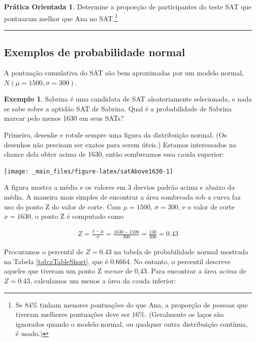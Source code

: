 \documentclass[
]{book}
\theoremstyle{definition}
\theoremstyle{definition}
\newtheorem{example}{Exemplo}[chapter]
\theoremstyle{definition}
\newtheorem{exercise}{Prática Orientada}[chapter]
\theoremstyle{definition}
\theoremstyle{remark}
\begin{document}
\begin{exercise}
\protect\hypertarget{exr:unnamed-chunk-91}{}{\label{exr:unnamed-chunk-91} }Determine a proporção de participantes do teste SAT que pontuaram melhor que Ana no SAT.\footnote{Se \(84\%\) tinham menores pontuações do que Ana, a proporção de pessoas que tiveram melhores pontuações deve ser \(16\%\). (Geralmente os laços são ignorados quando o modelo normal, ou qualquer outra distribuição contínua, é usado.)}
\end{exercise}

\begin{center}\rule{0.5\linewidth}{0.5pt}\end{center}

\hypertarget{normalProbabiliyExamples}{%
\subsection{Exemplos de probabilidade normal}\label{normalProbabiliyExamples}}

A pontuação cumulativa do SAT são bem aproximadas por um modelo normal, \(N(\mu=1500, \sigma=300)\).

\begin{example}
\protect\hypertarget{exm:unnamed-chunk-92}{}{\label{exm:unnamed-chunk-92} }Sabrina é uma candidata de SAT aleatoriamente selecionada, e nada se sabe sobre a aptidão SAT de Sabrina. Qual é a probabilidade de Sabrina marcar pelo menos 1630 em seus SATs?

Primeiro, desenhe e rotule sempre uma figura da distribuição normal. (Os desenhos não precisam ser exatos para serem úteis.) Estamos interessados na chance dela obter acima de 1630, então sombreamos essa cauda superior:
\end{example}

\texttt{[image: \_main\_files/figure-latex/satAbove1630-1]}

A figura mostra a média e os valores em 3 desvios padrão acima e abaixo da média. A maneira mais simples de encontrar a área sombreada sob a curva faz uso do ponto Z do valor de corte. Com \(\mu=1500\), \(\sigma=300\), e o valor de corte \(x=1630\), o ponto Z é computado como

\begin{eqnarray*}
Z = \frac{x - \mu}{\sigma} = \frac{1630 - 1500}{300} = \frac{130}{300} = 0.43
\end{eqnarray*}

Procuramos o percentil de \(Z=0.43\) na tabela de probabilidade normal mostrada na Tabela \ref{tab:zTableShort}, que é 0.6664. No entanto, o percentil descreve aqueles que tiveram um ponto Z \emph{menor} de 0,43. Para encontrar a área \emph{acima} de \(Z=0.43\), calculamos um menos a área da cauda inferior:
\end{document}
